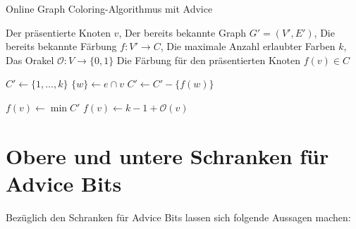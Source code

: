 \documentclass[11pt,abstracton]{scrreprt} %
\theoremstyle{definition}
\begin{document}
\begin{algorithm}
\caption{Online Graph Coloring-Algorithmus mit Advice}
\label{algo.advice}
\begin{algorithmic}
\Require
	\State Der präsentierte Knoten $v$,
	\State Der bereits bekannte Graph $G' = (V', E')$,
	\State Die bereits bekannte Färbung $f : V' \rightarrow C$,
	\State Die maximale Anzahl erlaubter Farben $k$,
	\State Das Orakel $\mathcal{O} : V \rightarrow \{0,1\}$
\Ensure
	\State Die Färbung für den präsentierten Knoten $f(v) \in C$
\Statex

\State $C' \gets \{1, \dots, k\}$
	\State $\{w\} \gets e \cap v$
		\State $C' \gets C' - \{ f(w) \}$
	\EndIf
	\EndIf
\EndFor
\EndFor

\Statex

	\State $ f(v) \gets \min C'$
\Else
	\State $ f(v) \gets k-1+\mathcal{O}(v)$
\EndIf

\end{algorithmic}
\end{algorithm}

\section{Obere und untere Schranken für Advice Bits}

Bezüglich den Schranken für Advice Bits lassen sich folgende Aussagen machen:
\end{document}
